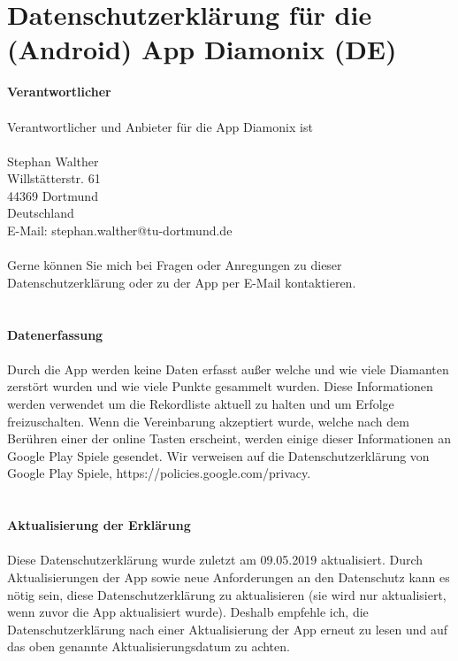 \documentclass[a4paper,12pt]{article}
\begin{document}
\section{Datenschutzerkl\"arung f\"ur die (Android) App Diamonix (DE)}\normalsize
\bigskip
\textbf{Verantwortlicher} \\
\\
Verantwortlicher und Anbieter f\"ur die App Diamonix ist \\
\\
Stephan Walther \\
Willst\"atterstr. 61 \\
44369 Dortmund \\
Deutschland \\
E-Mail: stephan.walther@tu-dortmund.de \\
\\
Gerne k\"onnen Sie mich bei Fragen oder Anregungen zu dieser Datenschutzerkl\"arung oder
zu der App per E-Mail kontaktieren. \\
\\
\\
\textbf{Datenerfassung} \\
\\
Durch die App werden keine Daten erfasst au{\ss}er welche und wie viele Diamanten
zerst\"ort wurden und wie viele Punkte gesammelt wurden.
Diese Informationen werden verwendet
um die Rekordliste aktuell zu halten und um Erfolge freizuschalten. Wenn
die Vereinbarung akzeptiert wurde, welche nach dem Ber\"uhren einer der online 
Tasten erscheint, werden einige dieser Informationen an Google Play Spiele gesendet.
Wir verweisen auf die Datenschutzerkl\"arung von Google Play Spiele,
https://policies.google.com/privacy. \\
\\
\\
\textbf{Aktualisierung der Erkl\"arung} \\
\\
Diese Datenschutzerkl\"arung wurde zuletzt am 09.05.2019 aktualisiert.
Durch Aktualisierungen der App sowie neue Anforderungen an den Datenschutz kann es n\"otig sein, diese Datenschutzerkl\"arung zu aktualisieren (sie wird nur aktualisiert, wenn zuvor die App aktualisiert wurde). Deshalb empfehle ich, die Datenschutzerkl\"arung nach einer Aktualisierung der App erneut zu lesen und auf das oben genannte Aktualisierungsdatum zu achten.
\end{document}
